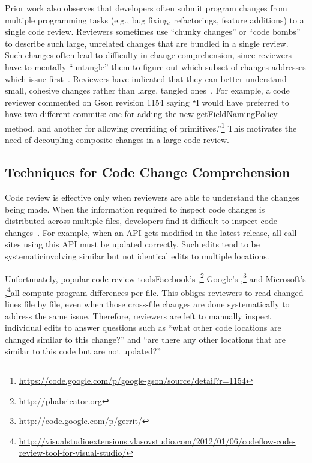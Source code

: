 \documentclass[runningheads,a4paper]{llncs}
\begin{document}
Prior work also observes that developers often submit program changes from multiple programming tasks (e.g., bug fixing, refactorings, feature additions) to a single code review. Reviewers sometimes use ``chunky changes'' or ``code bombs'' to describe such large, unrelated changes that are bundled in a single review. Such changes often lead to difficulty in change comprehension, since reviewers have to mentally ``untangle'' them to figure out which subset of changes addresses which issue first~\cite{kawrykow2011non, murphy2012we, herzig2013impact}. Reviewers have indicated that they can better understand small, cohesive changes rather than large, tangled ones~\cite{rigby2008open}. For example, a code reviewer commented on Gson revision 1154 saying ``I would have preferred to have two different commits: one for adding the new {\ttt getFieldNamingPolicy} method, and another for allowing overriding of primitives.''\footnote{\url{https://code.google.com/p/google-gson/source/detail?r=1154}} This motivates the need of decoupling composite changes in a large code review. 


\subsection{Techniques for Code Change Comprehension} 

Code review is effective only when reviewers are able to understand the changes being made. When the information required to inspect code changes is distributed across multiple files, developers find it difficult to inspect code changes~\cite{dunsmore2000object}. For example, when an API gets modified in the latest release, all call sites using this API must be updated correctly. Such edits tend to be systematic\textemdash involving similar but not identical edits to multiple locations.



Unfortunately, popular code review tools\textemdash Facebook's {\phabricator},\footnote{\url{http://phabricator.org}} Google's {\gerrit},\footnote{\url{http://code.google.com/p/gerrit/}} and Microsoft's {\codeflow},\footnote{\url{http://visualstudioextensions.vlasovstudio.com/2012/01/06/codeflow-code-review-tool-for-visual-studio/}}\textemdash all compute program differences per file. This obliges reviewers to read changed lines file by file, even when those cross-file changes are done systematically to address the same issue. Therefore, reviewers are left to manually inspect individual edits to answer questions such as ``what other code locations are changed similar to this change?'' and ``are there any other locations that are similar to this code but are not updated?''
\end{document}
